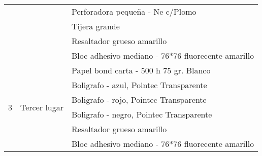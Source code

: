\documentclass{article}
\begin{document}
\begin{table}[htbp]
{\begin{tabular}{|c|c|l|}
\cmidrule{3-3}          &       & Perforadora pequeña - Ne c/Plomo \\
\cmidrule{3-3}          &       & Tijera grande \\
\cmidrule{3-3}          &       & Resaltador grueso amarillo \\
\cmidrule{3-3}          &       & Bloc adhesivo mediano - 76*76 fluorecente amarillo \\
    \midrule
    \multirow{6}[12]{*}{3} & \multirow{6}[12]{*}{Tercer lugar} & Papel bond carta - 500 h 75 gr. Blanco \\
\cmidrule{3-3}          &       & Boligrafo - azul, Pointec Transparente \\
\cmidrule{3-3}          &       & Boligrafo - rojo, Pointec Transparente \\
\cmidrule{3-3}          &       & Boligrafo - negro, Pointec Transparente \\
\cmidrule{3-3}          &       & Resaltador grueso amarillo \\
\cmidrule{3-3}          &       & Bloc adhesivo mediano - 76*76 fluorecente amarillo \\
    \bottomrule
    \end{tabular}}%
  \label{tab:addlabel}%
\end{table}
\end{document}
